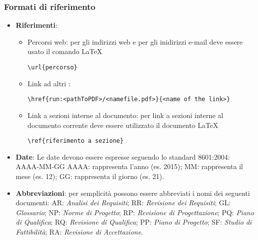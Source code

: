 \documentclass{scalatekids-article}
\begin{document}
\subsubsection{Formati di riferimento}
\begin{itemize}
\item \textbf{Riferimenti}:
  \begin{itemize}
  \item Percorsi web: per gli indirizzi web e per gli inidirizzi e-mail deve essere usato il comando \LaTeX\xspace
    \begin{center}
      \verb=\url{percorso}=
    \end{center}
  \item Link ad altri :
    \begin{center}
      \verb=\href{run:<pathToPDF>/<namefile.pdf>}{<name of the link>}=
    \end{center}
  \item Link a sezioni interne al documento: per link a sezioni interne al documento corrente deve essere utilizzato il documento \LaTeX\xspace
    \begin{center}
      \verb=\ref{riferimento a sezione}=
    \end{center}
  \end{itemize}
\item \textbf{Date}: Le date devono essere espresse seguendo lo standard \textit{} 8601:2004:
  AAAA-MM-GG
  AAAA: rappresenta l'anno (es. 2015);
  MM:	rappresenta il mese (es. 12);
  GG: rappresenta il giorno (es. 21).

\item \textbf{Abbreviazioni}: per semplicità possono essere abbreviati i nomi dei seguenti documenti:
  AR: \textit{Analisi dei Requisiti};
  RR: \textit{Revisione dei Requisiti};
  GL: \textit{Glossario};
  NP: \textit{Norme di Progetto};
  RP: \textit{Revisione di Progettazione};
  PQ: \textit{Piano di Qualifica};
  RQ: \textit{Revisione di Qualifica};
  PP: \textit{Piano di Progetto};
  SF: \textit{Studio di Fattibilità};
  RA: \textit{Revisione di Accettazione}.


\end{itemize}
\end{document}
